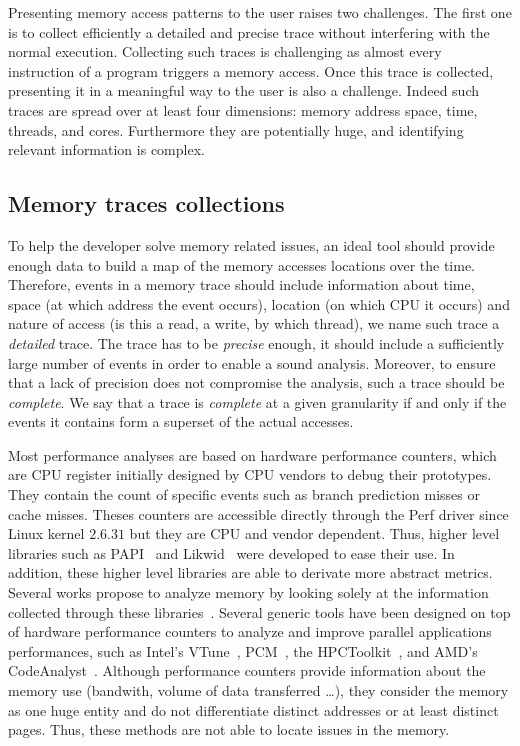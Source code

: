 Presenting memory access patterns to the user raises two challenges.
The first one is to collect efficiently a detailed and precise trace without interfering with the normal execution.
Collecting such traces is challenging as almost every instruction of a program triggers a memory access.
Once this trace is collected, presenting it in a meaningful way to the user is also a challenge.
Indeed such traces are spread over at least four dimensions: memory address space, time, threads, and cores.
Furthermore they are potentially huge, and identifying relevant information is complex.

\subsection{Memory traces collections}

To help the developer solve memory related issues, an ideal tool should provide enough data to build a map of the memory accesses locations over the time.
Therefore, events in a memory trace should include information about time, space (at which address the event occurs), location (on which CPU it occurs) and nature of access (is this a read, a write, by which thread), we name such trace a \emph{detailed} trace.
The trace has to be \emph{precise} enough, it should include a sufficiently large number of events in order to enable a sound analysis.
Moreover, to ensure that a lack of precision does not compromise the analysis, such a trace should be \emph{complete}.
We say that a trace is \emph{complete} at a given granularity if and only if the events it contains form a superset of the actual accesses.

Most performance analyses are based on hardware performance counters, which are \gls{CPU} register initially designed by \gls{CPU} vendors to debug their prototypes.
They contain the count of specific events such as branch prediction misses or cache misses.
Theses counters are accessible directly  through the \gls{Perf} driver since Linux kernel $2.6.31$ but they are \gls{CPU} and vendor dependent.
Thus, higher level libraries such as \gls{PAPI}~\cite{Weaver13PAPI} and \gls{Likwid}~\cite{Treibig10LIKWID} were developed to ease their use.
In addition, these higher level libraries are able to derivate more abstract metrics.
Several works propose to analyze memory  by looking solely at the information collected through these libraries~\cite{Majo13(Mis)understanding, Jiang14Understanding,Bosch00Rivet,Weyers14Visualization,Tao01Visualizing,DeRose01Hardware}.
Several generic tools have been designed on top of hardware performance counters to analyze and improve parallel applications performances, such as Intel's \gls{VTune}~\cite{Reinders05VTune}, \gls{PCM}~\cite{Wilhalm12Intel}, the \gls{HPCToolkit}~\cite{Adhianto10HPCTOOLKIT}, and AMD's \gls{CodeAnalyst}~\cite{Drongowski08introduction}.
Although performance counters provide information about the memory use (bandwith, volume of data transferred \ldots),  they consider the memory as one huge entity and do not differentiate distinct addresses or at least distinct pages.
Thus, these methods are not able to locate issues in the memory.

